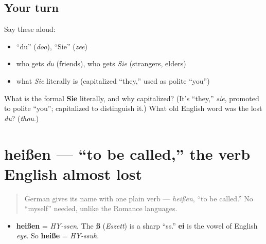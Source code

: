 \subsection*{Your turn}
Say these aloud:

\begin{itemize}
\raggedright
  \item \textquotedblleft{}du\textquotedblright{} (\emph{doo}), \textquotedblleft{}Sie\textquotedblright{} (\emph{zee})
  \item who gets \emph{du} (friends), who gets \emph{Sie} (strangers, elders)
  \item what \emph{Sie} literally is (capitalized \textquotedblleft{}they,\textquotedblright{} used as polite \textquotedblleft{}you\textquotedblright{})
\end{itemize}

\begin{tcolorbox}[breakable,colback=teal!4,colframe=teal!35!black,title={Before you move on}]
What is the formal \textbf{Sie} literally, and why capitalized? (It's \textquotedblleft{}they,\textquotedblright{} \emph{sie}, promoted to polite \textquotedblleft{}you\textquotedblright{}; capitalized to distinguish it.) What old English word was the lost \emph{du}? (\emph{thou}.)
\end{tcolorbox}
\section[heißen]{heißen — \textquotedblleft{}to be called,\textquotedblright{} the verb English almost lost}

\label{lesson:GE-C02-heissen}



\begin{quote}
German gives its name with one plain verb — \emph{heißen}, \textquotedblleft{}to be called.\textquotedblright{} No \textquotedblleft{}myself\textquotedblright{} needed, unlike the Romance languages.
\end{quote}

\begin{sounds}
\begin{itemize}
\raggedright
  \item \textbf{heißen} = \emph{HY-ssen}. The \textbf{ß} (\emph{Eszett}) is a sharp \textquotedblleft{}ss.\textquotedblright{} \textbf{ei} is the vowel of English \emph{eye}. So \textbf{heiße} = \emph{HY-ssuh}.
\end{itemize}
\end{sounds}

